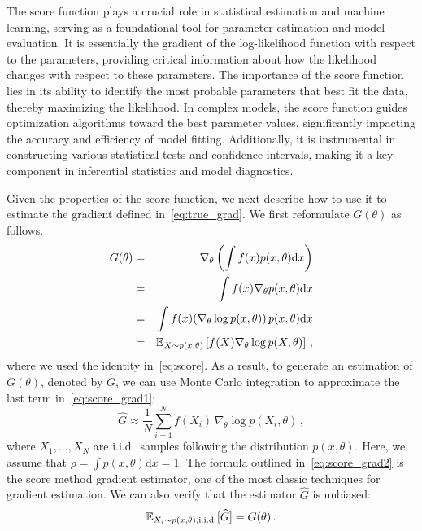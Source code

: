 \documentclass[12pt]{amsart}
\newcommand{\rd}{\mathrm{d}}
\begin{document}
The score function plays a crucial role in statistical estimation and machine learning, serving as a foundational tool for parameter estimation and model evaluation. It is essentially the gradient of the log-likelihood function with respect to the parameters, providing critical information about how the likelihood changes with respect to these parameters. The importance of the score function lies in its ability to identify the most probable parameters that best fit the data, thereby maximizing the likelihood. In complex models, the score function guides optimization algorithms toward the best parameter values, significantly impacting the accuracy and efficiency of model fitting. Additionally, it is instrumental in constructing various statistical tests and confidence intervals, making it a key component in inferential statistics and model diagnostics.



Given the properties of the score function, we next describe how to use it to estimate the gradient defined in~\eqref{eq:true_grad}. We first reformulate $G(\theta)$ as follows.
\begin{eqnarray}
    G(\theta) &=&  \nabla_\theta \left( \int f(x) p (x,\theta) \rd x \right) \nonumber \\
    &=& \int f(x) \nabla_\theta p (x,\theta) \rd x \nonumber \\
    &=& \int f(x) (\nabla_\theta \log p (x,\theta)) \, p(x,\theta) \rd x  \nonumber \\
    &=& \bbE_{X\sim p (x,\theta)} \left[  f(X) \nabla_\theta \log p (X,\theta)\right]\,,\label{eq:score_grad1}
\end{eqnarray}
where we used the identity in~\eqref{eq:score}. As a result,  to generate an estimation of $G(\theta)$, denoted by $\widehat {G}$, we can use Monte Carlo integration to approximate the last term in~\eqref{eq:score_grad1}:
\begin{equation}\label{eq:score_grad2}
    \widehat {G} \approx \frac{1}{N} \sum_{i=1}^N f(X_i) \, \nabla_\theta \log p (X_i,\theta)\,,
\end{equation}
where $X_1,\ldots, X_N$ are i.i.d.~samples following the distribution $p (x,\theta)$. Here, we assume that $\rho  = \int p (x,\theta) \rd x = 1$. 
The formula outlined in~\eqref{eq:score_grad2} is the score method gradient estimator, one of the most classic techniques for gradient estimation. We can also verify that the estimator $\widehat{G}$ is unbiased:
\[
\mathbb E_{X_i\sim p(x,\theta),\text{i.i.d.}}[\widehat {G} ] = G(\theta)\,.
\]
\end{document}
